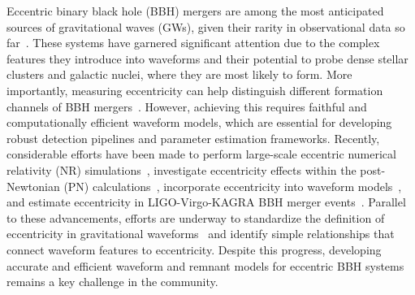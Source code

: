 \documentclass[aps,prd,amsmath,floats,floatfix, twocolumn,
superscriptaddress,nofootinbib,showpacs,longbibliography]{revtex4-1}
\begin{document}
Eccentric binary black hole (BBH) mergers are among the most anticipated sources of gravitational waves (GWs), given their rarity in observational data so far~\cite{Harry:2010zz,VIRGO:2014yos,KAGRA:2020tym,LIGOScientific:2018mvr,LIGOScientific:2020ibl,LIGOScientific:2021usb,LIGOScientific:2021djp}. These systems have garnered significant attention due to the complex features they introduce into waveforms and their potential to probe dense stellar clusters and galactic nuclei, where they are most likely to form. More importantly, measuring eccentricity can help distinguish different formation channels of BBH mergers~\cite{Rodriguez:2017pec,Rodriguez:2018pss,Samsing:2017xmd,Zevin:2018kzq,Zevin:2021rtf,Samsing:2020tda}. However, achieving this requires faithful and computationally efficient waveform models, which are essential for developing robust detection pipelines and parameter estimation frameworks. Recently, considerable efforts have been made to perform large-scale eccentric numerical relativity (NR) simulations~\cite{Mroue:2010re, Healy:2017zqj,Buonanno:2006ui,Husa:2007rh,Ramos-Buades:2018azo,Ramos-Buades:2019uvh,Purrer:2012wy,Bonino:2024xrv,Ramos-Buades:2022lgf}, investigate eccentricity effects within the post-Newtonian (PN) calculations~\cite{Arun:2009mc,Tanay:2016zog,Paul:2022xfy,Henry:2023tka}, incorporate eccentricity into waveform models~\cite{Tiwari:2019jtz, Huerta:2014eca, Moore:2016qxz, Damour:2004bz, Konigsdorffer:2006zt, Memmesheimer:2004cv,Hinder:2017sxy, Cho:2021oai,Chattaraj:2022tay,Hinderer:2017jcs,Cao:2017ndf,Chiaramello:2020ehz,Albanesi:2023bgi,Albanesi:2022xge,Riemenschneider:2021ppj,Chiaramello:2020ehz,Ramos-Buades:2021adz,Liu:2023ldr,Huerta:2016rwp,Huerta:2017kez,Joshi:2022ocr,Setyawati:2021gom,Wang:2023ueg,Islam:2021mha,Carullo:2023kvj,Nagar:2021gss,Tanay:2016zog,Paul:2024ujx,Manna:2024ycx,Gamboa:2024hli,Gamboa:2024imd,Buonanno:1998gg,Buonanno:2000ef}, and estimate eccentricity in LIGO-Virgo-KAGRA BBH merger events~\cite{Romero-Shaw:2020thy,Gayathri:2020coq,Gamba:2021gap,Ramos-Buades:2023yhy,Gupte:2024jfe}. Parallel to these advancements, efforts are underway to standardize the definition of eccentricity in gravitational waveforms~\cite{blanchet:2013haa,Mroue:2010re, Healy:2017zqj,Mora:2002gf,Ramos-Buades:2021adz,Islam:2021mha,Ramos-Buades:2019uvh,Shaikh:2023ypz,Knee:2022hth,Boschini:2024scu,Islam:2025oiv} and identify simple relationships that connect waveform features to eccentricity. Despite this progress, developing accurate and efficient waveform and remnant models for eccentric BBH systems remains a key challenge in the community.
\end{document}
